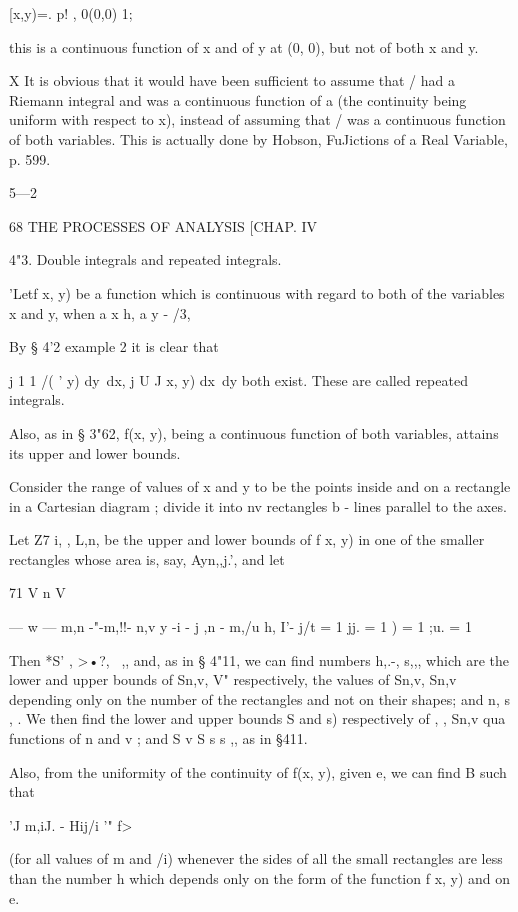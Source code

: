  [x,y)=. p! , 0(0,0) 1; 

this is a continuous function of x and of y at (0, 0), but not of both x and y. 

X It is obvious that it would have been sufficient to assume that /  had a Riemann integral 
and was a continuous function of a (the continuity being uniform with respect to x), instead 
of assuming that /  was a continuous function of both variables. This is actually done by 
Hobson, FuJictions of a Real Variable, p. 599. 

5—2 



68 THE PROCESSES OF ANALYSIS [CHAP. IV 

4"3. Double integrals and repeated integrals. 

'Letf x, y) be a function which is continuous with regard to both of the 
variables x and y, when a  x  h, a y -  /3, 

By § 4'2 example 2 it is clear that 

j 1 1 /( ' y) dy\ dx, j U J x, y) dx\ dy 
both exist. These are called repeated integrals. 



Also, as in § 3"62, f(x, y), being a continuous function of both variables, 
attains its upper and lower bounds. 

Consider the range of values of x and y to be the points inside and on a 
rectangle in a Cartesian diagram ; divide it into nv rectangles b - lines parallel 
to the axes. 

Let Z7 i, , L,n,  be the upper and lower bounds of f x, y) in one of the 
smaller rectangles whose area is, say, Ayn,,j.', and let 

71 V n V 

— w —   m,n -"-m,!!-   n,v y   -i - j ,n - m,/u   h, I'- 
j/t = 1 jj. = 1 )  = 1 ;u. = 1 

Then *S' ,  >•?, \  ,, and, as in § 4"11, we can find numbers  h,.-, s,,,  which 
are the lower and upper bounds of Sn,v, V" respectively, the values of 
Sn,v, Sn,v depending only on the number of the rectangles and not on their 
shapes; and  n, s , . We then find the lower and upper bounds  S and s) 
respectively of   ,  , Sn,v qua functions of n and v ; and S   v  S s  s  ,, as in 
§411. 

Also, from the uniformity of the continuity of f(x, y), given e, we can find 
B such that 

'J m,iJ. - Hij/i '"  f> 

(for all values of m and /i) whenever the sides of all the small rectangles are 
less than the number h which depends only on the form of the function f x, y) 
and on e. 

